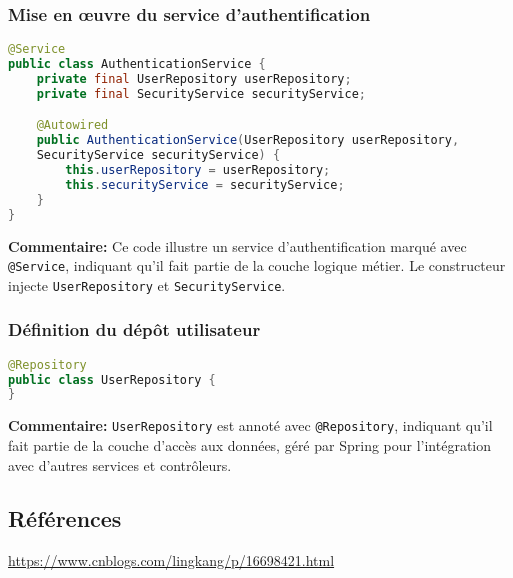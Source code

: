 \documentclass{article}
\begin{document}
\subsubsection{Mise en œuvre du service d'authentification}
\begin{lstlisting}[language=Java]
@Service
public class AuthenticationService {
    private final UserRepository userRepository;
    private final SecurityService securityService;

    @Autowired
    public AuthenticationService(UserRepository userRepository, 
    SecurityService securityService) {
        this.userRepository = userRepository;
        this.securityService = securityService;
    }
}
\end{lstlisting}
\textbf{Commentaire:} Ce code illustre un service d'authentification marqué avec \texttt{@Service}, indiquant qu'il fait partie de la couche logique métier. Le constructeur injecte \texttt{UserRepository} et \texttt{SecurityService}.

\subsubsection{Définition du dépôt utilisateur}
\begin{lstlisting}[language=Java]
@Repository
public class UserRepository {
}
\end{lstlisting}
\textbf{Commentaire:} \texttt{UserRepository} est annoté avec \texttt{@Repository}, indiquant qu'il fait partie de la couche d'accès aux données, géré par Spring pour l'intégration avec d'autres services et contrôleurs.

\subsection{Références}
\href{https://www.cnblogs.com/lingkang/p/16698421.html}{https://www.cnblogs.com/lingkang/p/16698421.html}
\section{}
\end{document}
